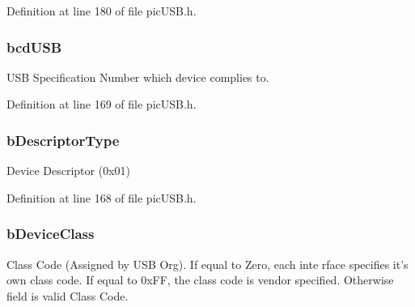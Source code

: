Definition at line 180 of file pic\-U\-S\-B.\-h.

\hypertarget{struct_u_s_b___device___descriptor_adec107f638eb1313f918ae1816d70b4f}{
\subsubsection[{bcd\-U\-S\-B}]{ bcd\-U\-S\-B}}\label{struct_u_s_b___device___descriptor_adec107f638eb1313f918ae1816d70b4f}
U\-S\-B Specification Number which device complies to. 

Definition at line 169 of file pic\-U\-S\-B.\-h.

\hypertarget{struct_u_s_b___device___descriptor_af6d6c7e334878414c973fc10e54cfb4e}{
\subsubsection[{b\-Descriptor\-Type}]{ b\-Descriptor\-Type}}\label{struct_u_s_b___device___descriptor_af6d6c7e334878414c973fc10e54cfb4e}
Device Descriptor (0x01) 

Definition at line 168 of file pic\-U\-S\-B.\-h.

\hypertarget{struct_u_s_b___device___descriptor_a2f8fee89c530db85ad73a73dde2ffe6b}{
\subsubsection[{b\-Device\-Class}]{ b\-Device\-Class}}\label{struct_u_s_b___device___descriptor_a2f8fee89c530db85ad73a73dde2ffe6b}
Class Code (Assigned by U\-S\-B Org). If equal to Zero, each inte rface specifies it’s own class code. If equal to 0x\-F\-F, the class code is vendor specified. Otherwise field is valid Class Code. 

